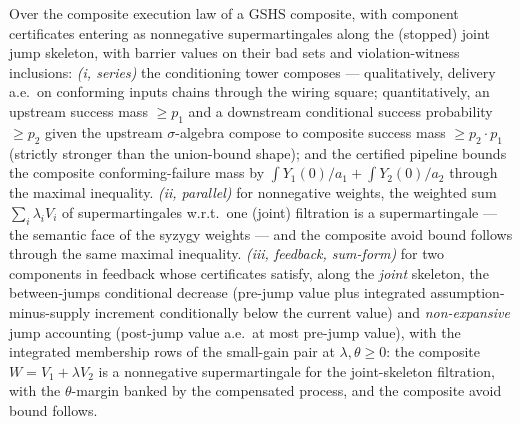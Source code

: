 \begin{blemma}\label{lem:qag-feedback}
Over the composite execution law of a GSHS composite, with component
certificates entering as nonnegative supermartingales along the
(stopped) joint jump skeleton, with barrier values on their bad sets
and violation-witness inclusions:
\emph{(i, series)} the conditioning tower composes --- qualitatively,
delivery a.e.\ on conforming inputs chains through the wiring square;
quantitatively, an upstream success mass $\geq p_1$ and a downstream
conditional success probability $\geq p_2$ given the upstream
$\sigma$-algebra compose to composite success mass
$\geq p_2 \cdot p_1$ (strictly stronger than the union-bound shape);
and the certified pipeline bounds the composite conforming-failure
mass by $\int Y_1(0) / a_1 + \int Y_2(0) / a_2$ through the maximal
inequality.
\emph{(ii, parallel)} for nonnegative weights, the weighted sum
$\sum_i \lambda_i V_i$ of supermartingales w.r.t.\ one (joint)
filtration is a supermartingale --- the semantic face of the syzygy
weights --- and the composite avoid bound follows through the same
maximal inequality.
\emph{(iii, feedback, sum-form)} for two components in feedback whose
certificates satisfy, along the \emph{joint} skeleton, the
between-jumps conditional decrease (pre-jump value plus integrated
assumption-minus-supply increment conditionally below the current
value) and \emph{non-expansive} jump accounting (post-jump value a.e.\
at most pre-jump value), with the integrated membership rows of the
small-gain pair at $\lambda, \theta \geq 0$: the composite
$W = V_1 + \lambda V_2$ is a nonnegative supermartingale for the
joint-skeleton filtration, with the $\theta$-margin banked by the
compensated process, and the composite avoid bound follows.
\end{blemma}
